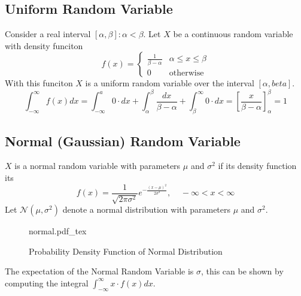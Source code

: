 \documentclass{article}
\newcommand{\incfig}[1]{%
    \def\svgwidth{\columnwidth}
    {#1.pdf_tex}
}
\theoremstyle{definition}
\begin{document}
    \subsection{Uniform Random Variable}
        Consider a real interval $[\alpha, \beta] : \alpha < \beta$. Let $X$ be a continuous random variable with density funciton 
        \[
            f(x) =
            \begin{cases}
                \frac{1}{\beta - \alpha} & \alpha \leq x \leq \beta\\
                0 & \text{otherwise}
            \end{cases}
        \]
        With this funciton $X$ is a uniform random variable over the interval $[\alpha, beta]$.
        \[
            \int_{-\infty}^\infty f(x) dx = \int_{-\infty} ^ a 0 \cdot dx + \int_\alpha^\beta \frac{dx}{\beta - \alpha} + \int_\beta^\infty 0 \cdot dx = \left[\frac{x}{\beta - \alpha}\right]_\alpha^\beta = 1
        \]
    \subsection{Normal (Gaussian) Random Variable}
    $X$ is a normal random variable with parameters $\mu$ and $\sigma^2$ if its density function its
    \[
        f(x) = \frac{1}{\sqrt{2\pi \sigma^2}} e^{-\frac{(x-\mu)^2}{2\sigma^2}}, \ \ \ \ \ -\infty < x < \infty
    \]
    Let $\mathcal{N}(\mu, \sigma^2)$ denote a normal distribution with parameters $\mu$ and $\sigma^2$.
    \begin{figure}[ht]
        \centering
        \incfig{normal}
        \caption{Probability Density Function of Normal Distribution}
        \label{fig:normal}
    \end{figure}
    The expectation of the Normal Random Variable is $\sigma$, this can be shown by computing the integral $\int_{-\infty}^\infty x \cdot f(x) dx$.
\end{document}
